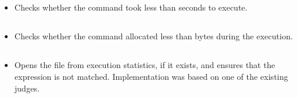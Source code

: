 \subsection*{}\label{subsec:UsedTimePostcondition}
\begin{itemize}[label={}]
    \item Checks whether the command took less than  seconds to execute.
\end{itemize}

\subsection*{}\label{subsec:UsedMemoryPostcondition}
\begin{itemize}[label={}]
    \item Checks whether the command allocated less than  bytes during the execution.
\end{itemize}

\subsection*{}\label{subsec:PSQLErrorPostcondition}
\begin{itemize}[label={}]
    \item Opens the  file from execution statistics, if it exists, and ensures that the
           expression is not matched.
          Implementation was based on one of the existing judges.
\end{itemize}
